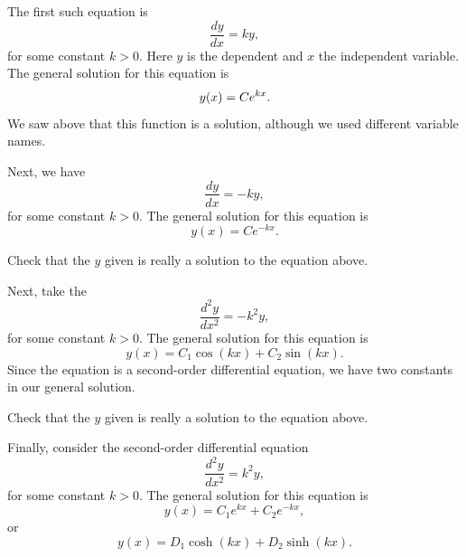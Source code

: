 \medskip

The first such equation is
\begin{equation*}
\frac{dy}{dx} = k y ,
\end{equation*}
for some constant $k > 0$.
Here $y$ is the dependent and $x$ the independent variable.
The general solution for this equation is
\begin{equation*}
y(x) = C e^{kx} .
\avoidbreak
\end{equation*}
We saw above that this function is a solution, although we used different
variable names.

\medskip

Next, we have
\begin{equation*}
\frac{dy}{dx} = -k y ,
\end{equation*}
for some constant $k > 0$.
The general solution for this equation is
\begin{equation*}
y(x) = C e^{-kx} .
\end{equation*}

\begin{exercise}
Check that the $y$ given is really a solution to the equation above.
\end{exercise}

Next, take the
\emph{}
\begin{equation*}
\frac{d^2y}{dx^2} = -k^2 y ,
\end{equation*}
for some constant $k > 0$.
The general solution for this equation is
\begin{equation*}
y(x) = C_1 \cos(kx) + C_2 \sin(kx) .
\end{equation*}
Since the equation is a second-order differential equation,
we have two constants in our general solution.

\begin{exercise}
Check that the $y$ given is really a solution to the equation above.
\end{exercise}

Finally, consider the second-order differential equation
\begin{equation*}
\frac{d^2y}{dx^2} = k^2 y ,
\end{equation*}
for some constant $k > 0$.
The general solution for this equation is
\begin{equation*}
y(x) = C_1 e^{kx} + C_2 e^{-kx} ,
\end{equation*}
or
\begin{equation*}
y(x) = D_1 \cosh(kx) + D_2 \sinh(kx) .
\end{equation*}


